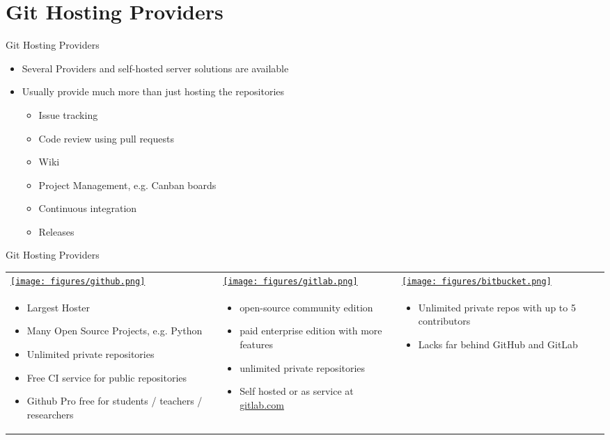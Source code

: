 \section{Git Hosting Providers}

\begin{frame}[c]{Git Hosting Providers}
  \begin{itemize}
    \item Several Providers and self-hosted server solutions are available
    \item Usually provide much more than just hosting the repositories
      \begin{itemize}
        \item Issue tracking
        \item Code review using pull requests
        \item Wiki
        \item Project Management, e.g. Canban boards
        \item Continuous integration
        \item Releases
      \end{itemize}
  \end{itemize}
\end{frame}

\begin{frame}[c]{Git Hosting Providers}
  \small
  \begin{tabu}{@{} X[,C] @{} X[,C] @{} X[,C] @{}}
    \href{https://github.com}{\texttt{[image: figures/github.png]}} &
    \href{https://gitlab.com}{\texttt{[image: figures/gitlab.png]}} &
    \href{https://bitbucket.org}{\texttt{[image: figures/bitbucket.png]}} \\
    \begin{itemize}
      \item Largest Hoster
      \item Many Open Source Projects, e.g. Python
      \item Unlimited private repositories
      \item Free CI service for public repositories
      \item Github Pro free for students / teachers / researchers
    \end{itemize}
    &
    \begin{itemize}
      \item open-source community edition
      \item paid enterprise edition with more features
      \item unlimited private repositories
      \item Self hosted or as service at \href{https://gitlab.com}{gitlab.com}
    \end{itemize}
    &
    \begin{itemize}
      \item Unlimited private repos with up to 5 contributors
      \item Lacks far behind GitHub and GitLab
    \end{itemize}
  \end{tabu}
\end{frame}

